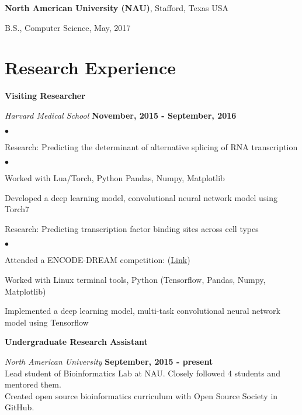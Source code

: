 \documentclass[margin,line]{res}
\newenvironment{list1}{
  \begin{list}{\ding{113}}{%
      \setlength{\itemsep}{0in}
      \setlength{\parsep}{0in} \setlength{\parskip}{0in}
      \setlength{\topsep}{0in} \setlength{\partopsep}{0in} 
      \setlength{\leftmargin}{0.17in}}}{\end{list}}
\newenvironment{list2}{
  \begin{list}{$\bullet$}{%
      \setlength{\itemsep}{0in}
      \setlength{\parsep}{0in} \setlength{\parskip}{0in}
      \setlength{\topsep}{0in} \setlength{\partopsep}{0in} 
      \setlength{\leftmargin}{0.2in}}}{\end{list}}
\begin{document}
\begin{resume}
{\bf North American University (NAU)}, Stafford, Texas USA\\
\vspace*{-.1in}
\begin{list1}
\item[] B.S., Computer Science,  May, 2017
\end{list1}


\section{\sc Research Experience}

{\bf Visiting Researcher}

\vspace{-.3cm}
{\em Harvard Medical School} \hfill {\bf November, 2015 - September, 2016}\\
\vspace{-.3cm}
\begin{list2}
\item Research: Predicting the determinant of alternative splicing of RNA transcription
\begin{list2}
\item Worked with Lua/Torch, Python Pandas, Numpy, Matplotlib
\item Developed a deep learning model, convolutional neural network model using Torch7 
\end{list2}
\item Research: Predicting transcription factor binding sites across cell types
\begin{list2}
\item Attended a ENCODE-DREAM competition: (\href{https://www.synapse.org/#!Synapse:syn6131484}{Link})
\item Worked with Linux terminal tools, Python (Tensorflow, Pandas, Numpy, Matplotlib)
\item Implemented a deep learning model, multi-task convolutional neural network model using Tensorflow
\end{list2}
\end{list2}

{\bf Undergraduate Research Assistant}

\vspace{-.3cm}
{\em North American University} \hfill {\bf September, 2015 - present}\\
Lead student of Bioinformatics Lab at NAU. Closely followed 4 students and mentored them.\\
Created open source bioinformatics curriculum with Open Source Society in GitHub.


\end{resume}
\end{document}
